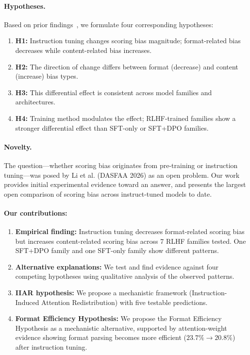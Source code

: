 \documentclass[11pt,a4paper]{article}
\begin{document}
\paragraph{Hypotheses.} Based on prior findings~\cite{pan2025user,thakur2024judging}, we formulate four corresponding hypotheses:
\begin{enumerate}
    \item \textbf{H1:} Instruction tuning changes scoring bias magnitude; format-related bias decreases while content-related bias increases.
    \item \textbf{H2:} The direction of change differs between format (decrease) and content (increase) bias types.
    \item \textbf{H3:} This differential effect is consistent across model families and architectures.
    \item \textbf{H4:} Training method modulates the effect; RLHF-trained families show a stronger differential effect than SFT-only or SFT+DPO families.
\end{enumerate}

\paragraph{Novelty.} The question---whether scoring bias originates from pre-training or instruction tuning---was posed by Li et al. (DASFAA 2026) as an open problem. Our work provides initial experimental evidence toward an answer, and presents the largest open comparison of scoring bias across instruct-tuned models to date.

\paragraph{Our contributions:}
\begin{enumerate}
    \item \textbf{Empirical finding:} Instruction tuning decreases format-related scoring bias but increases content-related scoring bias across 7 RLHF families tested. One SFT+DPO family and one SFT-only family show different patterns.
    \item \textbf{Alternative explanations:} We test and find evidence against four competing hypotheses using qualitative analysis of the observed patterns.
    \item \textbf{IIAR hypothesis:} We propose a mechanistic framework (Instruction-Induced Attention Redistribution) with five testable predictions.
    \item \textbf{Format Efficiency Hypothesis:} We propose the Format Efficiency Hypothesis as a mechanistic alternative, supported by attention-weight evidence showing format parsing becomes more efficient ($23.7\% \to 20.8\%$) after instruction tuning.
\end{enumerate}
\end{document}
